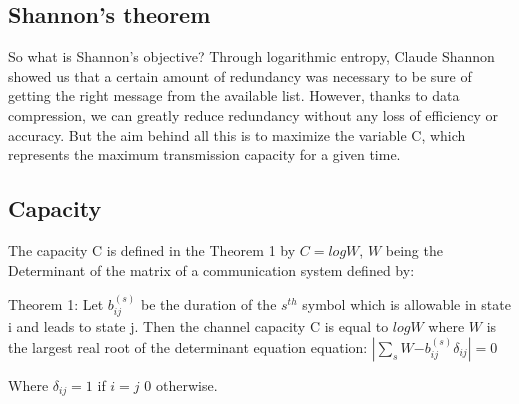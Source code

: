 \subsection{Shannon's theorem}\cite{shannon1948mathematical}

So what is Shannon's objective? 
Through logarithmic entropy, Claude Shannon showed us that a certain amount of redundancy was necessary to be sure of getting the right message from the available list. However, thanks to data compression, we can greatly reduce redundancy without any loss of efficiency or accuracy.
But the aim behind all this is to maximize the variable C, which represents the maximum transmission capacity for a given time.

\subsection{Capacity}

The capacity C is defined in the Theorem 1 by $C = logW$, $W$ being the Determinant of the matrix of a communication system defined by:

Theorem 1: Let $b_{ij}^{(s)}$ be the duration of the $s^{th}$ symbol which is allowable in state i and leads to state j.
Then the channel capacity C is equal to $logW$ where $W$ is the largest real root of the determinant equation equation: $|\sum_s W{-b_{ij}^{(s)}} \delta{_{ij}}| = 0$

Where $\delta{_{ij}} = 1$ if $i = j$ 0 otherwise.